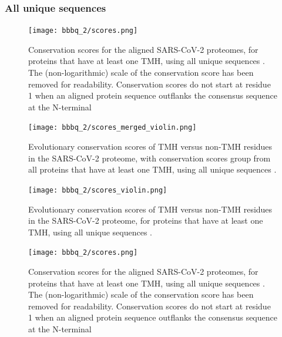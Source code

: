 \subsubsection{All unique sequences}

\begin{figure}[!htbp]
  \texttt{[image: bbbq\_2/scores.png]}
  \caption{
    Conservation scores for the aligned SARS-CoV-2 proteomes,
    for proteins that have at least one TMH,
    using all unique sequences .
    The (non-logarithmic) scale of the conservation score has been removed
    for readability.
    Conservation scores do not start at residue 1 when
    an aligned protein sequence outflanks the consensus sequence 
    at the N-terminal
  }
  \label{fig:evolutionary_conservation_all_unique}
\end{figure}

\begin{figure}[!htbp]
  \texttt{[image: bbbq\_2/scores\_merged\_violin.png]}
  \caption{
    Evolutionary conservation scores of TMH versus non-TMH
    residues in the SARS-CoV-2 proteome,
    with conservation scores group from all proteins that have at least one TMH,
    using all unique sequences .
  }
  \label{fig:evolutionary_conservation_all_unique_merged}
\end{figure}

\begin{figure}[!htbp]
  \texttt{[image: bbbq\_2/scores\_violin.png]}
  \caption{
    Evolutionary conservation scores of TMH versus non-TMH
    residues in the SARS-CoV-2 proteome,
    for proteins that have at least one TMH,
    using all unique sequences .
  }
  \label{fig:evolutionary_conservation_all_unique_violin}
\end{figure}

\begin{figure}[!htbp]
  \texttt{[image: bbbq\_2/scores.png]}
  \caption{
    Conservation scores for the aligned SARS-CoV-2 proteomes,
    for proteins that have at least one TMH,
    using all unique sequences .
    The (non-logarithmic) scale of the conservation score has been removed
    for readability.
    Conservation scores do not start at residue 1 when
    an aligned protein sequence outflanks the consensus sequence 
    at the N-terminal
  }
  \label{fig:evolutionary_conservation_all_unique}
\end{figure}

